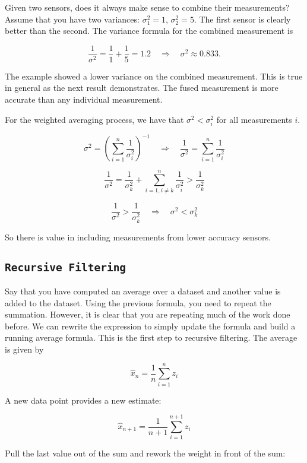 Given two sensors, does it always make sense to combine their
measurements? Assume that you have two variances: \(\sigma_1^2 = 1\),
\(\sigma_2^2 = 5\). The first sensor is clearly better than the second.
The variance formula for the combined measurement is

\[\frac{1}{\sigma^2} = \frac{1}{1} + \frac{1}{5} = 1.2 \quad \Rightarrow \quad \sigma^2 \approx 0.833.\]

The example showed a lower variance on the combined measurement. This is
true in general as the next result demonstrates. The fused measurement
is more accurate than any individual measurement.

For the weighted averaging process, we have that
\(\sigma^2 < \sigma_i^2\) for all measurements \(i\).

\[\sigma^2 = \left(\displaystyle\sum_{i=1}^n \displaystyle \frac{1}{\sigma_i^2}\right)^{-1} \quad \Rightarrow
\quad \displaystyle \frac{1}{\sigma^2} = \sum_{i=1}^n \displaystyle \frac{1}{\sigma_i^2}\]

\[\displaystyle \frac{1}{\sigma^2} =  \frac{1}{\sigma_k^2} +  \sum_{i=1, i\neq k}^n \displaystyle \frac{1}{\sigma_i^2} >
 \frac{1}{\sigma_k^2}\]

\[\displaystyle \frac{1}{\sigma^2} >  \frac{1}{\sigma_k^2}    \quad \Rightarrow \quad \sigma^2 < \sigma_k^2\]

So there is value in including measurements from lower accuracy sensors.

\hypertarget{recursive-filtering}{%
\subsection{\texorpdfstring{\texttt{Recursive\ Filtering}}{Recursive Filtering}}\label{recursive-filtering}}

Say that you have computed an average over a dataset and another value
is added to the dataset. Using the previous formula, you need to repeat
the summation. However, it is clear that you are repeating much of the
work done before. We can rewrite the expression to simply update the
formula and build a running average formula. This is the first step to
recursive filtering. The average is given by

\[\hat{x}_n = \displaystyle \frac{1}{n}\sum_{i=1}^n z_i\]

A new data point provides a new estimate:

\[\hat{x}_{n+1} = \displaystyle \frac{1}{n+1}\sum_{i=1}^{n+1} z_i\]

Pull the last value out of the sum and rework the weight in front of the
sum:

